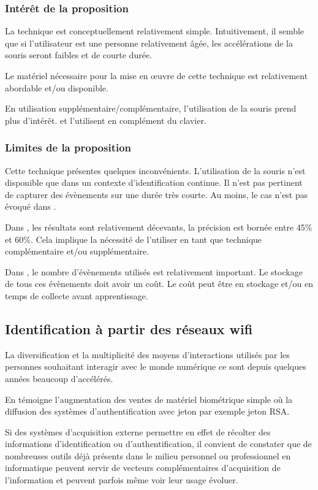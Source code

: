 \documentclass[conference,compsoc]{IEEEtran}
\begin{document}
\subsubsection{Intérêt de la proposition}
La technique est conceptuellement relativement simple. Intuitivement, il semble que si l'utilisateur est une personne relativement âgée, les accélérations de la souris seront faibles et de courte durée.

Le matériel nécessaire pour la mise en \oe{}uvre de cette technique est relativement abordable et/ou disponible.

En utilisation supplémentaire/complémentaire, l'utilisation de la souris prend plus d'intérêt. \cite{fridman2015multi} et \cite{7477228} l'utilisent en complément du clavier.

\subsubsection{Limites de la proposition}
Cette technique présentes quelques inconvénients. L'utilisation de la souris n'est disponible que dans un contexte d'identification continue. Il n'est pas pertinent de capturer des évènements sur une durée très courte. Au moins, le cas n'est pas évoqué dans \cite{7477228}.

Dans \cite{7477228}, les résultats sont relativement décevants, la précision est bornée entre 45\% et 60\%. Cela implique la nécessité de l'utiliser en tant que technique complémentaire et/ou supplémentaire.

Dans \cite{fridman2015multi}, le nombre d'évènements utilisés est relativement important. Le stockage de tous ces évènements doit avoir un coût. Le coût peut être en stockage et/ou en temps de collecte avant apprentissage.

\subsection{Identification à partir des réseaux wifi} %

La diversification et la multiplicité des moyens d'interactions utilisés par les personnes souhaitant interagir avec le monde numérique ce sont depuis quelques années beaucoup d'accélérés.

En témoigne l'augmentation des ventes de matériel biométrique simple où la diffusion des systèmes d'authentification avec jeton par exemple jeton RSA.

Si des systèmes d'acquisition externe permettre en effet de récolter des informations d'identification ou d'authentification, il convient de constater que de nombreuses outils déjà présents dans le milieu personnel ou professionnel en informatique peuvent servir de vecteurs complémentaires d'acquisition de l'information et peuvent parfois même voir leur usage évoluer.
\end{document}
